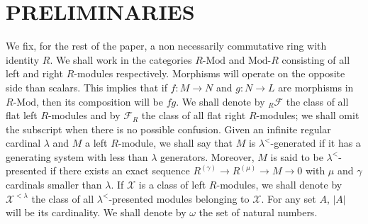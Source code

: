 \documentclass[a4paper,10pt]{amsart}
\begin{document}
\section{PRELIMINARIES}
\label{sec:preliminaries}

We fix, for the rest of the paper, a non necessarily commutative ring
with identity $R$. We shall work in the categories ${R\textrm{-Mod}}$ and ${\textrm{Mod-}R}$
consisting of all left and right $R$-modules respectively. Morphisms
will operate on the opposite side than scalars. This implies that if
$f:M \rightarrow N$ and $g:N \rightarrow L$ are morphisms in ${R\textrm{-Mod}}$,
then its composition will be $fg$. We shall denote by ${_R}{\mathcal
  F}$ the class of all flat left $R$-modules and by $\mathcal F_R$ the
class of all flat right $R$-modules; we shall omit the subscript when
there is no possible confusion. Given an infinite regular cardinal $\lambda$
and $M$ a left $R$-module, we shall say that $M$ is
$\lambda^<$-generated if it has a generating system with less than
$\lambda$ generators. Moreover, $M$ is said to be $\lambda^<$-presented
if there exists an exact sequence $R^{(\gamma)} \rightarrow R^{(\mu)}
\rightarrow M \rightarrow 0$ with $\mu$ and $\gamma$ cardinals smaller
than $\lambda$. If $\mathcal X$ is a class of left $R$-modules, we
shall denote by $\mathcal X^{< \lambda}$ the class of all
$\lambda^<$-presented modules belonging to $\mathcal X$. For any set $A$, $|A|$
will be its cardinality. We shall denote by $\omega$ the set of
natural numbers.
\end{document}
